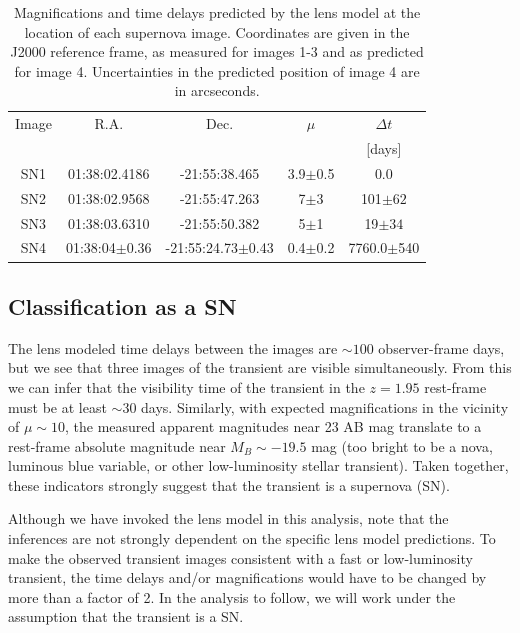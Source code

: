\documentclass[12pt,dvipsnames]{article}
\begin{document}
\begin{table}[]
    \centering
    \begin{tabular}{c|c|c|c|c|}
    Image     & R.A. & Dec. & $\mu$ & $\Delta t$ \\
    & & & & [days] \\
\hline 
SN1 & 01:38:02.4186     & -21:55:38.465         & 3.9$\pm$0.5   &   0.0 \\
SN2 & 01:38:02.9568     & -21:55:47.263         & 7$\pm$3     & 101$\pm62$ \\
SN3 & 01:38:03.6310     & -21:55:50.382         & 5$\pm$1     &  19$\pm34$\\
SN4 & 01:38:04$\pm$0.36 & -21:55:24.73$\pm$0.43 & 0.4$\pm$0.2 & 7760.0$\pm$540\\
\hline 
\end{tabular}
    \caption{Magnifications and time delays predicted by the lens model at the location of each supernova image. Coordinates are given in the J2000 reference frame, as measured for images 1-3 and as predicted for image 4. Uncertainties in the predicted position of image 4 are in arcseconds.}
    \label{tab:snpred}
\end{table}


\subsection*{Classification as a SN}
The lens modeled time delays between the images are $\sim100$ observer-frame days, 
but we see that three images of the transient are visible simultaneously.
From this we can infer that the visibility time of the transient in the $z=1.95$ rest-frame must be at least $\sim$30 days. 
Similarly, with expected magnifications in the vicinity of $\mu\sim10$, the measured apparent magnitudes near 23 AB mag translate to a rest-frame absolute magnitude near $M_B \sim-19.5$ mag (too bright to be a nova, luminous blue variable, or other low-luminosity stellar transient).
Taken together, these indicators strongly suggest that the transient is a supernova (SN). 

Although we have invoked the lens model in this analysis, note that the inferences are not strongly dependent on the specific lens model predictions.  To make the observed transient images consistent with a fast or low-luminosity transient, the time delays and/or magnifications would have to be changed by more than a factor of 2.  In the analysis to follow, we will work under the assumption that the transient is a SN. 
\end{document}
